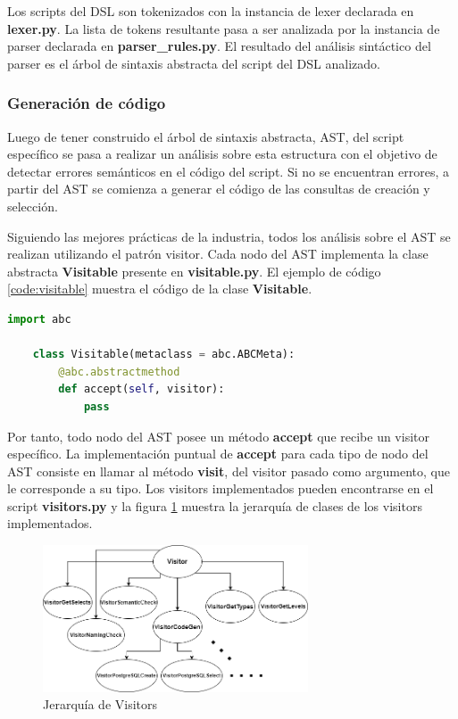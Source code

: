 Los scripts del DSL son tokenizados con la instancia de lexer declarada en \textbf{lexer.py}. La lista de tokens 
resultante pasa a ser analizada por la instancia de parser declarada en \textbf{parser\_rules.py}. El resultado 
del análisis sintáctico del parser es el \'arbol de sintaxis abstracta del script del DSL analizado.


\subsubsection{Generaci\'on de c\'odigo}

Luego de tener construido el árbol de sintaxis abstracta, AST, del script específico se pasa a realizar un análisis sobre 
esta estructura con 
el objetivo de detectar errores semánticos en el código del script. Si no se encuentran errores, 
a partir del AST se comienza a generar el código de las consultas de creación y selección.

Siguiendo las mejores prácticas de la industria, todos los análisis sobre el AST se realizan 
utilizando el patrón visitor\cite{buttner2004digging}. Cada nodo del AST implementa la clase abstracta 
\textbf{Visitable} presente en \textbf{visitable.py}. El ejemplo de c\'odigo \ref{code:visitable} 
muestra el c\'odigo de la clase \textbf{Visitable}.

\begin{lstlisting}[label={code:visitable}, caption={Clase abstracta Visitable}, language={python}]
    import abc

    class Visitable(metaclass = abc.ABCMeta):
        @abc.abstractmethod
        def accept(self, visitor):
            pass
\end{lstlisting}

Por tanto, todo nodo del AST posee un método \textbf{accept} que recibe un visitor específico. La implementación 
puntual de \textbf{accept} para cada tipo de nodo del AST consiste en llamar al método \textbf{visit}, del visitor pasado como argumento, 
que le corresponde a su tipo. Los visitors implementados pueden encontrarse en el script \textbf{visitors.py} y la 
figura \ref{fig:visitors} muestra la jerarquía de clases de los visitors implementados.

\begin{figure}[htb]
    \centering
    \includegraphics[width=0.7\textwidth]{Graphics/visitorfixed.drawio.png}
    \caption{Jerarquía de Visitors}
    \label{fig:visitors}
\end{figure}

